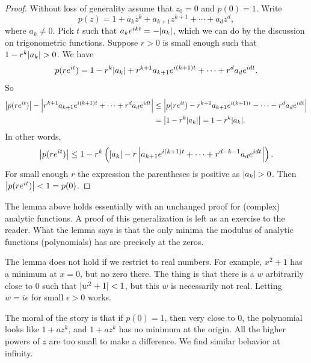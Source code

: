 \begin{proof}
Without loss of generality assume that $z_0 = 0$ and $p(0) = 1$.  Write
\begin{equation*}
p(z) = 1+a_kz^k + a_{k+1}z^{k+1} + \cdots + a_d z^d ,
\end{equation*}
where $a_k \not= 0$.  Pick $t$ such that $a_k e^{ikt} = -\lvert {a_k} \rvert$, which
we can do by the discussion on trigonometric functions.  Suppose
$r > 0$ is small enough such that
$1-r^k \lvert {a_k} \rvert > 0$.  We have
\begin{equation*}
p(r e^{it}) =
1-r^k \lvert {a_k} \rvert + r^{k+1}a_{k+1}e^{i(k+1)t} + \cdots + r^{d}a_{d}e^{idt} .
\end{equation*}
So
\begin{equation*}
\begin{split}
\left\lvert {
p(r e^{it}) } \right\rvert - \left\lvert {
r^{k+1}a_{k+1}e^{i(k+1)t} + \cdots + r^{d}a_{d}e^{idt}
} \right\rvert
& \leq
\left\lvert {
p(r e^{it}) 
- r^{k+1}a_{k+1}e^{i(k+1)t} - \cdots - r^{d}a_{d}e^{idt}
} \right\rvert
\\
& =
\left\lvert {
1-r^k \lvert {a_k} \rvert
} \right\rvert
=
1-r^k \lvert {a_k} \rvert .
\end{split}
\end{equation*}
In other words,
\begin{equation*}
\left\lvert {
p(r e^{it}) } \right\rvert
\leq
1-r^k \left( \lvert {a_k} \rvert
-
r
\left\lvert {
a_{k+1}e^{i(k+1)t} + \cdots + r^{d-k-1}a_{d}e^{idt}
} \right\rvert
\right) .
\end{equation*}
For small enough $r$ the expression the parentheses is positive
as $\lvert {a_k} \rvert > 0$.  Then $\left\lvert {p(re^{it})} \right\rvert < 1 = p(0)$.
\end{proof}

\begin{remark}
The lemma above holds essentially with an unchanged proof for (complex) analytic
functions.  A proof of this generalization is left as an exercise to the reader.
What the lemma
says is that the only minima the modulus of analytic functions (polynomials)
has are precisely at the zeros.
\end{remark}

\begin{remark}
The lemma does not hold if we restrict to real numbers.  For
example, $x^2+1$ has a minimum at $x=0$, but no zero there.  The thing is that
there is a $w$ arbitrarily close to $0$ such that $\lvert {w^2+1} \rvert < 1$, but this
$w$ is necessarily not real.  Letting $w = i\epsilon$ for small
$\epsilon > 0$ works.
\end{remark}

The moral of the story is that if $p(0) = 1$, then very close to 0, the
polynomial
looks like $1+az^k$, and $1+az^k$ has no minimum at the origin.  All the higher
powers of $z$ are too small to make a difference.  We find similar behavior
at infinity.

